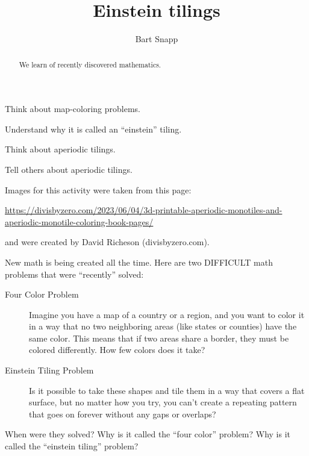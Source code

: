 \documentclass[noauthor,nooutcomes,handout,hints,12pt]{ximera}
\title{Einstein tilings}
\author{Bart Snapp}
\begin{document}
\begin{abstract}
We learn of recently discovered mathematics.
\end{abstract}
\maketitle

\begin{listOutcomes}
\item Think about map-coloring problems.
\item Understand why it is called an ``einstein'' tiling.
\item Think about aperiodic tilings.
\item Tell others about aperiodic tilings.
\end{listOutcomes}
Images for this activity were taken from this page:
\begin{center}
  \url{https://divisbyzero.com/2023/06/04/3d-printable-aperiodic-monotiles-and-aperiodic-monotile-coloring-book-pages/}
\end{center}
and were created by David Richeson (divisbyzero.com).


\mynewpage


\begin{question}
  New math is being created all the time. Here are two DIFFICULT math
  problems that were ``recently'' solved:
  \begin{description}
  \item[Four Color Problem] Imagine you have a map of a country or a
    region, and you want to color it in a way that no two neighboring
    areas (like states or counties) have the same color. This means
    that if two areas share a border, they must be colored
    differently. How few colors does it take?
  \item[Einstein Tiling Problem] Is it possible to take these shapes
    and tile them in a way that covers a flat surface, but no matter
    how you try, you can't create a repeating pattern that goes on
    forever without any gaps or overlaps?
  \end{description}
  When were they solved? Why is it called the ``four color'' problem? Why is it called the ``einstein tiling'' problem?
\end{question}

  
\mynewpage
\end{document}
